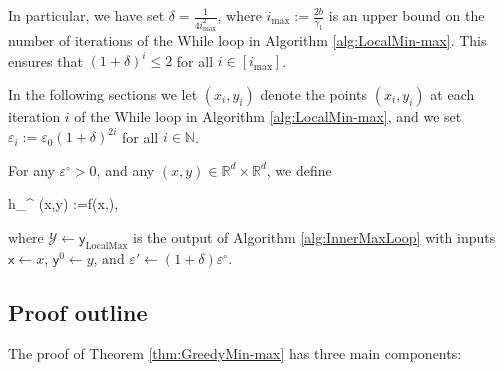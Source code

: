 \documentclass[11pt,letterpaper]{article}
\renewcommand{\epsilon}{\varepsilon}
\newcommand{\coloneqq}{:=}
\def \be{\begin{equs}}
\def \ee{\end{equs}}
\begin{document}
In particular, we have set $\delta = \frac{1}{4 i_{\mathrm{max}}^2}$, where $i_{\max} \coloneqq \frac{2b}{\gamma_1}$ is an upper bound on the number of iterations of the While loop in Algorithm \ref{alg:LocalMin-max}.  
%
This ensures that $(1+\delta)^i \leq 2$ for all $i \in [i_{\mathrm{max}}]$.
%

In the following sections we let $(x_i, y_i)$ denote the points  $(x_i, y_i)$  at each iteration $i$ of the While loop in Algorithm \ref{alg:LocalMin-max}, and we set $\epsilon_i \coloneqq \epsilon_0 (1+\delta)^{2i}$ for all $i \in \mathbb{N}$.


For any $\epsilon^{\circ}>0$, and any $(x,y) \in \mathbb{R}^d \times \mathbb{R}^d$, we define 
\be \label{eq:z1}
h_{\epsilon^{\circ}} (x,y) \coloneqq f(x,),
\ee
%
 where $\mathcal{Y} \leftarrow \mathsf{y}_{\mathrm{LocalMax}}$ is the output of Algorithm \ref{alg:InnerMaxLoop} with inputs $\mathsf{x} \leftarrow x$, $\mathsf{y}^0 \leftarrow y$, and
 $\epsilon' \leftarrow (1+\delta)\epsilon^{\circ}$. 

\subsection{Proof outline}
The proof of Theorem \ref{thm:GreedyMin-max} has three main components:
\end{document}
